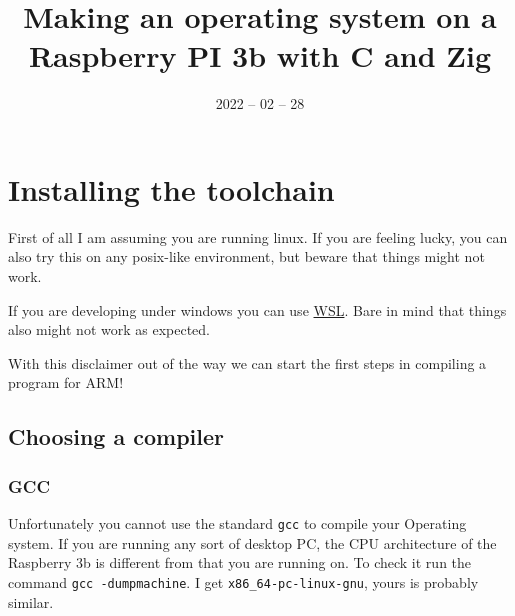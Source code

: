 \endofdump





\date{2022 -- 02 -- 28}
\title{Making an operating system on a Raspberry PI 3b with C and Zig}
\useTemplate[english]

\usepackage[outputdir=out]{minted}

\def\shell#1{\texttt{#1}}
\def\sh#1{\texttt{#1}}
\def\zig{\sh{zig}}




    \maketitle

    \section{Installing the toolchain}

    First of all I am assuming you are running linux.
    If you are feeling lucky, you can also try this on any posix-like environment, but beware that things might not work.

    If you are developing under windows you can use \href{https://docs.microsoft.com/en-us/windows/wsl/install}{WSL}.
    Bare in mind that things also might not work as expected.

    With this disclaimer out of the way we can start the first steps in compiling a program for ARM!

    \subsection{Choosing a compiler}

    \subsubsection{GCC}

    Unfortunately you cannot use the standard \shell{gcc} to compile your Operating system. If you are running any sort of desktop PC, the CPU architecture of the Raspberry 3b is
    different from that you are running on. To check it run the command \sh{gcc -dumpmachine}. I get \sh{x86_64-pc-linux-gnu}, yours is probably similar.

